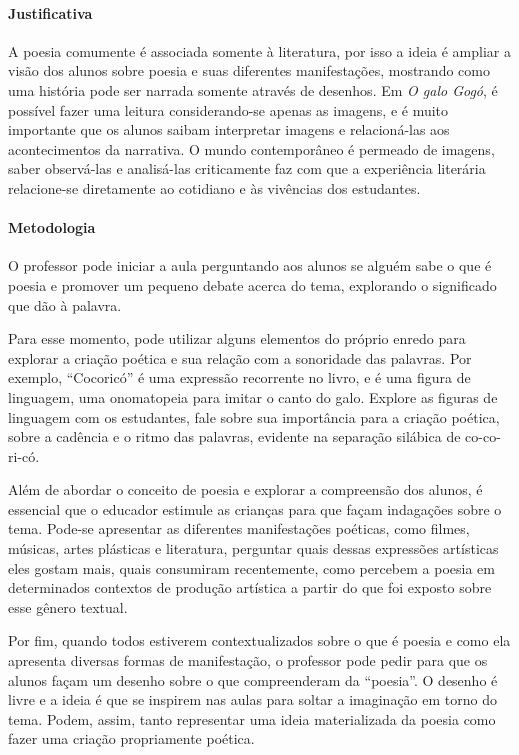 \documentclass[11pt]{extarticle}
\begin{document}
\paragraph{Justificativa} A poesia comumente é associada somente à literatura, por isso a ideia é ampliar a visão dos alunos sobre poesia e suas diferentes manifestações, mostrando como uma história pode ser narrada somente através de desenhos. Em \textit{O galo Gogó}, é possível fazer uma leitura considerando-se apenas as imagens, e é muito importante que os alunos saibam interpretar imagens e relacioná-las aos acontecimentos da narrativa. O mundo contemporâneo é permeado de imagens, saber observá-las e analisá-las criticamente faz com que a experiência literária relacione-se diretamente ao cotidiano e às vivências dos estudantes. 

\paragraph{Metodologia} O professor pode iniciar a aula perguntando aos alunos se alguém sabe o que é poesia e promover um pequeno debate acerca do tema, explorando o significado que dão à palavra.

Para esse momento, pode utilizar alguns elementos do próprio enredo para explorar a criação poética e sua relação com a sonoridade das palavras.
Por exemplo, “Cocoricó” é uma expressão recorrente no livro, e é uma figura de linguagem, uma onomatopeia para imitar o canto do galo. Explore as figuras de linguagem com os estudantes, fale sobre sua importância para a criação poética, sobre a cadência e o ritmo das palavras, evidente na separação silábica de co-co-ri-có.

Além de abordar o conceito de poesia e explorar a compreensão dos alunos, é essencial que o educador estimule as crianças para que façam indagações sobre o tema. Pode-se apresentar as diferentes manifestações poéticas, como filmes, músicas, artes plásticas e literatura, perguntar quais dessas expressões artísticas eles gostam mais, quais consumiram recentemente, como percebem a poesia em determinados contextos de produção artística a partir do que foi exposto sobre esse gênero textual.

Por fim, quando todos estiverem contextualizados sobre o que é poesia e como ela apresenta diversas formas de manifestação, o professor pode pedir para que os alunos façam um desenho sobre o que compreenderam da ``poesia''. O desenho é livre e a ideia é que se inspirem nas aulas para soltar a imaginação em torno do tema. Podem, assim, tanto representar uma ideia materializada da poesia como fazer uma criação propriamente poética.
\end{document}
